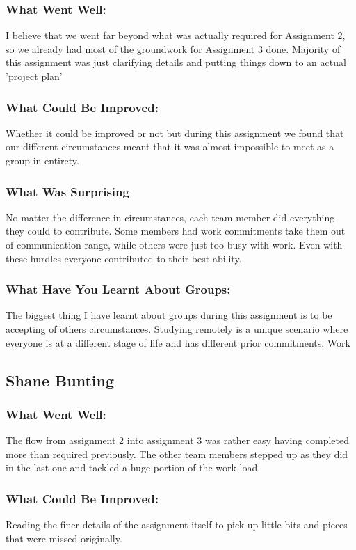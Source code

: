 \documentclass[11pt, oneside, a4paper, titlepage]{article}
\begin{document}
\subsubsection{What Went Well:}
I  believe that we went far beyond what was actually required for Assignment 2, so we already had most of the groundwork for Assignment 3 done.  Majority of this assignment was just clarifying details and putting things down to an actual 'project plan' 

\subsubsection{What Could Be Improved:}
Whether it could be improved or not but during this assignment we found that our different circumstances meant that it was almost impossible to meet as a group in entirety.  

\subsubsection{What Was Surprising}
No matter the difference in circumstances, each team member did everything they  could to contribute. Some members had work commitments take them out of communication range, while others were just too busy with work. Even with these hurdles everyone contributed to their best ability. 

\subsubsection{What Have You Learnt About Groups:}
The biggest thing I have learnt about groups during this assignment is to be accepting of others circumstances. Studying remotely is a unique scenario where everyone is at a different stage of life and has different prior commitments. Work 

\subsection{Shane Bunting}
\subsubsection{What Went Well:}
The flow from assignment 2 into assignment 3 was rather easy having completed more than required previously. The other team members stepped up as they did in the last one and tackled a huge portion of the work load. 

\subsubsection{What Could Be Improved:}
Reading the finer details of the assignment itself to pick up little bits and pieces that were missed originally.  
\end{document}
